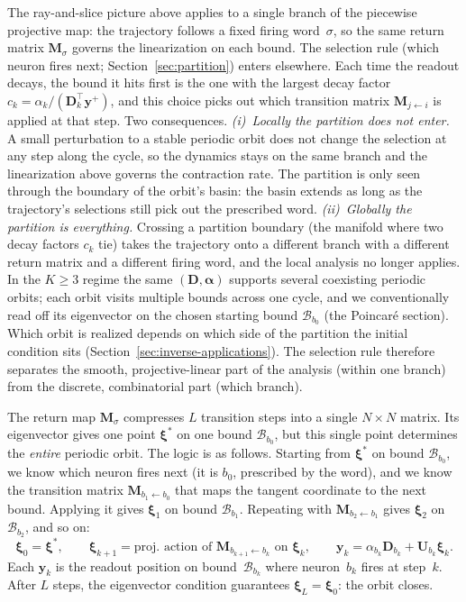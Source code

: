\documentclass[12pt]{article}
\newcommand{\vv}[1]{\mathbf{#1}}
\newcommand{\DD}{\vv{D}}
\newcommand{\yy}{\vv{y}}
\newcommand{\xxi}{\boldsymbol{\xi}}
\newcommand{\Bsp}{\mathcal{B}}
\begin{document}
The ray-and-slice picture above applies to a single branch of the piecewise projective map: the trajectory follows a fixed firing word~$\sigma$, so the same return matrix $\vv{M}_\sigma$ governs the linearization on each bound. The selection rule (which neuron fires next; Section~\ref{sec:partition}) enters elsewhere. Each time the readout decays, the bound it hits first is the one with the largest decay factor $c_k=\alpha_k/(\DD_k^\top\yy^+)$, and this choice picks out which transition matrix $\vv{M}_{j\leftarrow i}$ is applied at that step. Two consequences. \emph{(i)~Locally the partition does not enter.} A small perturbation to a stable periodic orbit does not change the selection at any step along the cycle, so the dynamics stays on the same branch and the linearization above governs the contraction rate. The partition is only seen through the boundary of the orbit's basin: the basin extends as long as the trajectory's selections still pick out the prescribed word. \emph{(ii)~Globally the partition is everything.} Crossing a partition boundary (the manifold where two decay factors $c_k$ tie) takes the trajectory onto a different branch with a different return matrix and a different firing word, and the local analysis no longer applies. In the $K\ge 3$ regime the same $(\vv{D},\boldsymbol{\alpha})$ supports several coexisting periodic orbits; each orbit visits multiple bounds across one cycle, and we conventionally read off its eigenvector on the chosen starting bound $\Bsp_{b_0}$ (the Poincar\'e section). Which orbit is realized depends on which side of the partition the initial condition sits (Section~\ref{sec:inverse-applications}). The selection rule therefore separates the smooth, projective-linear part of the analysis (within one branch) from the discrete, combinatorial part (which branch).

 The return map $\vv{M}_\sigma$ compresses $L$ transition steps into a single $N\times N$ matrix. Its eigenvector gives one point $\xxi^*$ on one bound $\Bsp_{b_0}$, but this single point determines the \emph{entire} periodic orbit. The logic is as follows. Starting from $\xxi^*$ on bound $\Bsp_{b_0}$, we know which neuron fires next (it is $b_0$, prescribed by the word), and we know the transition matrix $\vv{M}_{b_1\leftarrow b_0}$ that maps the tangent coordinate to the next bound. Applying it gives $\xxi_1$ on bound $\Bsp_{b_1}$. Repeating with $\vv{M}_{b_2\leftarrow b_1}$ gives $\xxi_2$ on $\Bsp_{b_2}$, and so on:
\begin{equation}\label{eq:orbit-points}
    \xxi_0=\xxi^*,\qquad \xxi_{k+1}=\text{proj.\ action of }\vv{M}_{b_{k+1}\leftarrow b_k}\text{ on }\xxi_k,\qquad \yy_k=\alpha_{b_k}\DD_{b_k}+\vv{U}_{b_k}\xxi_k.
\end{equation}
Each $\yy_k$ is the readout position on bound~$\Bsp_{b_k}$ where neuron~$b_k$ fires at step~$k$. After $L$ steps, the eigenvector condition guarantees $\xxi_L=\xxi_0$: the orbit closes.
\end{document}
